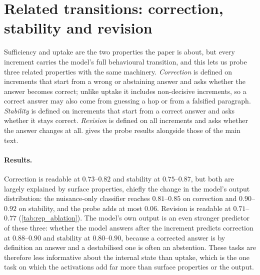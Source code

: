 \section{Related transitions: correction, stability and revision}
\label{app:related}

Sufficiency and uptake are the two properties the paper is about, but every increment carries the model's full behavioural transition, and this lets us probe three related properties with the same machinery. \emph{Correction} is defined on increments that start from a wrong or abstaining answer and asks whether the answer becomes correct; unlike uptake it includes non-decisive increments, so a correct answer may also come from guessing a hop or from a falsified paragraph. \emph{Stability} is defined on increments that start from a correct answer and asks whether it stays correct. \emph{Revision} is defined on all increments and asks whether the answer changes at all.  gives the probe results alongside those of the main text.

\begin{table}[t]
\centering\scriptsize
\setlength{\tabcolsep}{3pt}

\caption{Held-out AUROC of the best-layer probe on paired updates for all five tasks (document split; 95\% question-level bootstrap intervals), with the nuisance-only AUROC and the gain from adding the probe score to the nuisance classifier.}
\label{tab:probes_full}
\end{table}

\paragraph{Results.} Correction is readable at $0.73$--$0.82$ and stability at $0.75$--$0.87$, but both are largely explained by surface properties, chiefly the change in the model's output distribution: the nuisance-only classifier reaches $0.81$--$0.85$ on correction and $0.90$--$0.92$ on stability, and the probe adds at most $0.06$. Revision is readable at $0.71$--$0.77$ (\cref{tab:rep_ablation}). The model's own output is an even stronger predictor of these three: whether the model answers after the increment predicts correction at $0.88$--$0.90$ and stability at $0.80$--$0.90$, because a corrected answer is by definition an answer and a destabilised one is often an abstention. These tasks are therefore less informative about the internal state than uptake, which is the one task on which the activations add far more than surface properties or the output.

